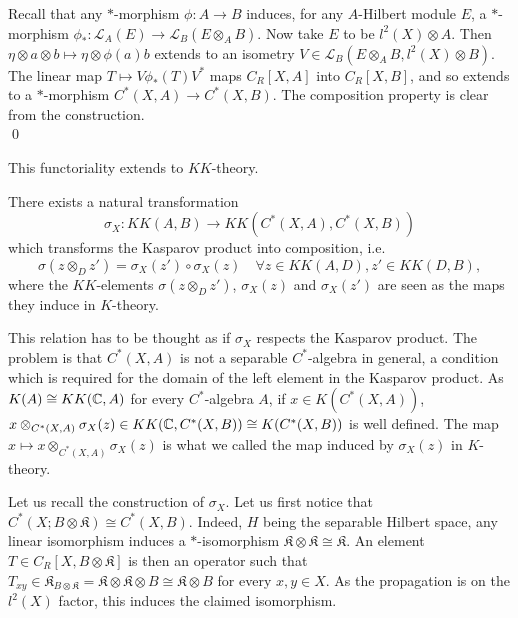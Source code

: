 \begin{dem}
Recall that any $*$-morphism $\phi : A\rightarrow B$ induces, for any $A$-Hilbert module $E$, a $*$-morphism $\phi_* : \mathcal L_A(E)\rightarrow \mathcal L_B(E\otimes_A B)$. Now take $E$ to be $l^2(X)\otimes A$. Then $\eta\otimes a\otimes b\mapsto \eta \otimes\phi(a) b $ extends to an isometry $V\in \mathcal L_B(E\otimes_A B,l^2(X)\otimes B)$.\\
The linear map $T \mapsto V\phi_*(T)V^*$ maps $C_R[X,A]$ into $C_R[X,B]$, and so extends to a $*$-morphism $C^*(X,A)\rightarrow C^*(X,B)$. The composition property is clear from the construction.\\
\qed
\end{dem}
This functoriality extends to $KK$-theory.

\begin{thm}\label{sigma} There exists a natural transformation 
\[\sigma_X : KK(A,B)\rightarrow KK(C^*(X,A),C^*(X,B))\]
which transforms the Kasparov product into composition, i.e. 
\[\sigma(z\otimes_D z')= \sigma_X(z')\circ \sigma_X(z) \quad \forall z\in KK(A,D),z'\in KK(D,B),\]
where the $KK$-elements $\sigma(z\otimes_D z')$, $ \sigma_X(z)$ and $\sigma_X(z')$ are seen as the maps they induce in $K$-theory. 
\end{thm}

\begin{rk}
This relation has to be thought as if $\sigma_X$ respects the Kasparov product. The problem is that $C^*(X,A)$ is not a separable $C^*$-algebra in general, a condition which is required for the domain of the left element in the Kasparov product. As $K(A) \cong KK(\mathbb C,A)$ for every $C^*$-algebra $A$, if $x\in K(C^*(X,A))$, $x\otimes_{C^*(X,A)}\sigma_X(z)\in KK(\mathbb C,C^*(X,B))\cong K(C^*(X,B))$ is well defined. The map $x\mapsto x\otimes_{C^*(X,A)}\sigma_X(z)$ is what we called the map induced by $\sigma_X(z)$ in $K$-theory.
\end{rk}

Let us recall the construction of $\sigma_X$. Let us first notice that $C^*(X;B\otimes\mathfrak K)\cong C^*(X,B)$. Indeed, $H$ being the separable Hilbert space, any linear isomorphism induces a $*$-isomorphism $\mathfrak K \otimes \mathfrak K \cong \mathfrak K$. An element $T\in C_R[X,B\otimes\mathfrak K]$ is then an operator such that $T_{xy}\in \mathfrak K_{B\otimes\mathfrak K}= \mathfrak K\otimes \mathfrak K \otimes B \cong \mathfrak K\otimes B$ for every $x,y\in X$. As the propagation is on the $l^2(X)$ factor, this induces the claimed isomorphism. \\

